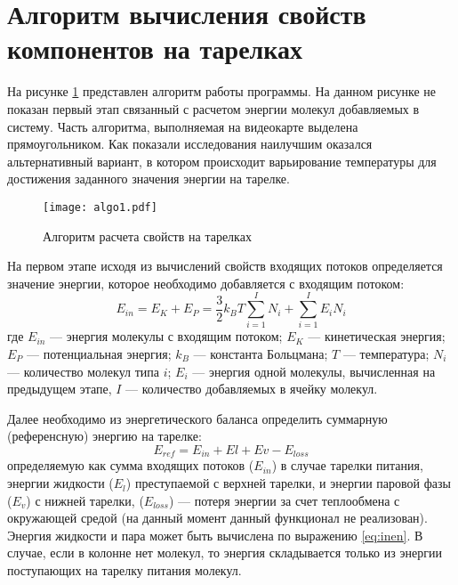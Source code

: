 \section{Алгоритм вычисления свойств компонентов на тарелках}

На рисунке \ref{fig:algo1} представлен алгоритм работы программы. На данном рисунке не показан первый этап связанный с расчетом энергии молекул добавляемых в систему. Часть алгоритма, выполняемая на видеокарте выделена прямоугольником. Как показали исследования наилучшим оказался альтернативный вариант, в котором происходит варьирование температуры для достижения заданного значения энергии на тарелке.

\begin{figure}
	\begin{center}
		\texttt{[image: algo1.pdf]}
	\end{center}
	\caption{Алгоритм расчета свойств на тарелках} \label{fig:algo1}
\end{figure}

На первом этапе исходя из вычислений свойств входящих потоков определяется значение энергии, которое необходимо добавляется с входящим потоком:
\begin{equation} \label{eq:inen}
	E_{in} = E_K + E_P = \dfrac{3}{2} k_B T \sum_{i=1}^{I} N_i  + \sum_{i=1}^{I} E_i  N_i  
\end{equation}
где $E_{in}$ --- энергия молекулы с входящим потоком; $E_K$ --- кинетическая энергия; $E_P$ --- потенциальная энергия; $k_B$ --- константа Больцмана; $T$ --- температура; $N_i$ --- количество молекул типа $i$; $E_i$ --- энергия одной молекулы, вычисленная на предыдущем этапе, $I$ --- количество добавляемых в ячейку молекул.

Далее необходимо из энергетического баланса определить суммарную (референсную) энергию на тарелке:
\begin{equation}
	E_{ref} = E_{in} + E{l} + E{v} - E_{loss}
\end{equation}
определяемую как сумма входящих потоков ($E_{in}$) в случае тарелки питания, энергии жидкости ($E_l$) преступаемой с верхней тарелки,  и энергии паровой фазы ($E_v$) с нижней тарелки, ($E_{loss}$) --- потеря энергии за счет теплообмена с окружающей средой (на данный момент данный функционал не реализован). Энергия жидкости и пара может быть вычислена по выражению \eqref{eq:inen}. В случае, если в колонне нет молекул, то энергия складывается только из энергии поступающих на тарелку питания молекул.

